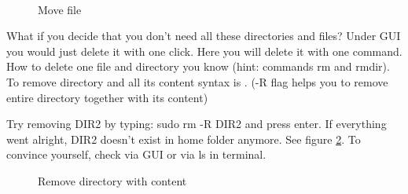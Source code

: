 \par \noindent {} \\

\begin{figure}[h!]	
	\centering
	\caption{Move file}	
	\label{fig:mv2}	
\end{figure}

\par \noindent What if you decide that you don't need all these directories and files? Under GUI you would just delete it with one click. Here you will delete it with one command. How to delete one file and directory you know (hint: commands rm and rmdir). To remove directory and all its content syntax is .  (-R flag helps you to remove entire directory together with its content) \\

\par \noindent Try removing DIR2 by typing: sudo rm -R DIR2 and press enter. If everything went alright, DIR2 doesn't exist in home folder anymore.  See figure \ref{fig:mv3}. To convince yourself, check via GUI or via ls in terminal.  \\

\begin{figure}[h!]	
	\centering
	\caption{Remove directory with content}	
	\label{fig:mv3}	
\end{figure}

